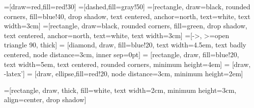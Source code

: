 \documentclass[a4paper,11pt,titlepage]{report}
\begin{document}
=[draw=red,fill=red!30]
=[dashed,fill=gray!50]
=[rectangle, draw=black, rounded corners, fill=blue!40, drop shadow,
        text centered, anchor=north, text=white, text width=3cm]
=[rectangle, draw=black, rounded corners, fill=green, drop shadow,
        text centered, anchor=north, text=white, text width=3cm]
=[->, >=open triangle 90, thick]
 = [diamond, draw, fill=blue!20,
    text width=4.5em, text badly centered, node distance=3cm, inner sep=0pt]
 = [rectangle, draw, fill=blue!20,
    text width=5em, text centered, rounded corners, minimum height=4em]
 = [draw, -latex']
 = [draw, ellipse,fill=red!20, node distance=3cm,
    minimum height=2em]

=[rectangle, draw, thick, fill=white, text width=2cm, minimum height=3cm, align=center,  drop shadow]

\newcount\colveccount
\newcommand*\colvec[1]{
        \global\colveccount#1
        \begin{pmatrix}
        \colvecnext
}
\def\colvecnext#1{
        #1
        \global\advance\colveccount-1
        \ifnum\colveccount>0
                \\
                \expandafter\colvecnext
        \else
                \end{pmatrix}
        \fi
}
\end{document}
